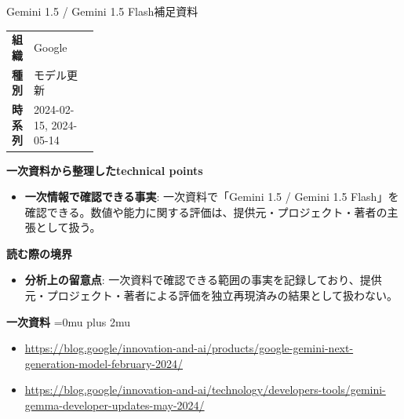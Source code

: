 \begin{technicalnote}{Gemini 1.5 / Gemini 1.5 Flash}{補足資料}
\begingroup
\begin{tabularx}{\linewidth}{@{}>{\bfseries}p{0.22\linewidth}X@{}}
組織 & Google \\
種別 & モデル更新 \\
時系列 & 2024-02-15, 2024-05-14 \\
\end{tabularx}
\smallskip
{\bfseries 一次資料から整理したtechnical points}
\begin{itemize}[leftmargin=1.5em,itemsep=0.35em]
\item \textbf{一次情報で確認できる事実}: 一次資料で「Gemini 1.5 / Gemini 1.5 Flash」を確認できる。数値や能力に関する評価は、提供元・プロジェクト・著者の主張として扱う。
\end{itemize}
\begin{minipage}{\linewidth}
{\bfseries 読む際の境界}
\begin{itemize}[leftmargin=1.5em,itemsep=0.35em]
\item \textbf{分析上の留意点}: 一次資料で確認できる範囲の事実を記録しており、提供元・プロジェクト・著者による評価を独立再現済みの結果として扱わない。
\end{itemize}
\begin{samepage}
{\bfseries 一次資料}
\begingroup\sloppy
\Urlmuskip=0mu plus 2mu\relax
\begin{itemize}[leftmargin=1.5em,itemsep=0.25em]
\item {\scriptsize\url{https://blog.google/innovation-and-ai/products/google-gemini-next-generation-model-february-2024/}}
\item {\scriptsize\url{https://blog.google/innovation-and-ai/technology/developers-tools/gemini-gemma-developer-updates-may-2024/}}
\end{itemize}
\endgroup
\end{samepage}
\end{minipage}
\endgroup
\end{technicalnote}
\medskip
